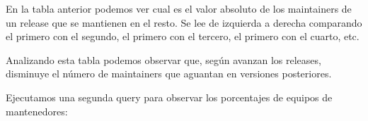 \documentclass[a4paper, 12pt]{book}
\begin{document}
	


	
	
	
	



	
	En la tabla anterior podemos ver cual es el valor absoluto de los maintainers de un release que se mantienen en el resto. Se lee de izquierda a derecha comparando el primero con el segundo, el primero con el tercero, el primero con el cuarto, etc.
	
	Analizando esta tabla podemos observar que, según avanzan los releases, disminuye el número de maintainers que aguantan en versiones posteriores.
	
	Ejecutamos una segunda query para observar los porcentajes de equipos de mantenedores:
	
\end{document}
